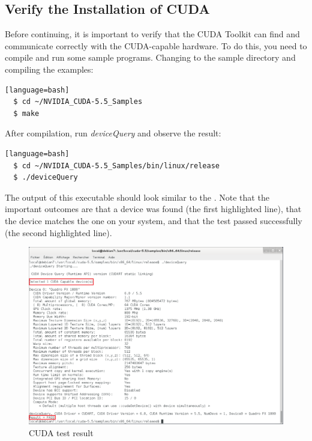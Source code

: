 \subsection{Verify the Installation of CUDA}
Before continuing, it is important to verify that the CUDA Toolkit can find and communicate correctly with the CUDA-capable hardware. To do this, you need to compile and run some sample programs.
Changing to the sample directory and compiling the examples:
\begin{lstlisting}[style=DOS][language=bash]
  $ cd ~/NVIDIA_CUDA-5.5_Samples 
  $ make
\end{lstlisting}
After compilation, run \textit{deviceQuery} and observe the result:
\begin{lstlisting}[style=DOS][language=bash]
  $ cd ~/NVIDIA_CUDA-5.5_Samples/bin/linux/release 
  $ ./deviceQuery
\end{lstlisting}
The output of this executable should look similar to the . Note that the important outcomes are that a device was found (the first highlighted line), that the device matches the one on your system, and that the test passed successfully (the second highlighted line).
\begin{figure}[htbp]
	\centering
		\includegraphics[width=13cm]{Figures/cudatest.png}
	\caption{CUDA test result}
	\label{fig:cudatest}
\end{figure}

